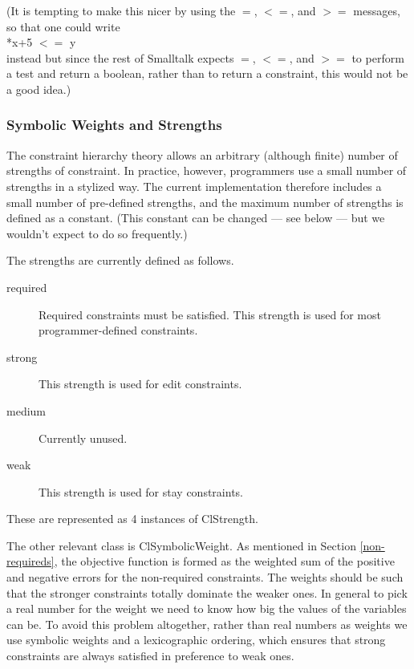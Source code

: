\documentclass{article}
\begin{document}
(It is tempting to make this nicer by using the $=$, $<=$, and $>=$
messages, so that one could write \\
\hspace*{1 cm} {*x+5 $<=$ y} \\
instead but since the rest of Smalltalk expects $=$, $<=$, and $>=$
to perform a test and return a boolean, rather than to return a constraint,
this would not be a good idea.)

\subsubsection{Symbolic Weights and Strengths}

The constraint hierarchy theory allows an arbitrary (although finite)
number of strengths of constraint.  In practice, however, programmers use a
small number of strengths in a stylized way.  The current implementation
therefore includes a small number of pre-defined strengths, and the maximum
number of strengths is defined as a constant.  (This constant can be
changed --- see below --- but we wouldn't expect to do so frequently.)

The strengths are currently defined as follows.

\begin{description}

\item[{\sf required}]  Required constraints must be satisfied.  This
strength is used for most programmer-defined constraints.

\item[{\sf strong}] This strength is used for edit constraints.

\item[{\sf medium}] Currently unused.  

\item[{\sf weak}] This strength is used for stay constraints.

\end{description}

These are represented as 4 instances of {\sf ClStrength}.

The other relevant class is {\sf ClSymbolicWeight}.  As mentioned in
Section \ref{non-requireds}, the objective function is formed as the
weighted sum of the positive and negative errors for the non-required
constraints.  The weights should be such that the stronger constraints
totally dominate the weaker ones.  In general to pick a real number for the
weight we need to know how big the values of the variables can be.  To
avoid this problem altogether, rather than real numbers as weights we use
symbolic weights and a lexicographic ordering, which ensures that strong
constraints are always satisfied in preference to weak ones.  
\end{document}
